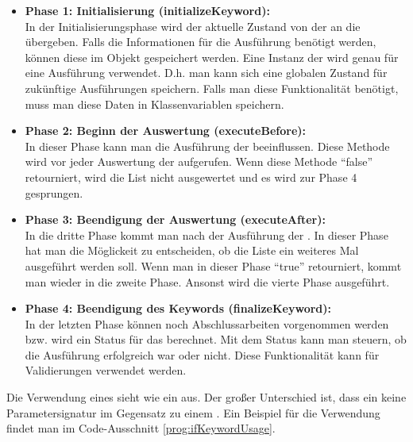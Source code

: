 \begin{itemize}

\item \textbf{Phase 1: Initialisierung (initializeKeyword):}\\
In der Initialisierungsphase wird der aktuelle Zustand von der  an die  übergeben. Falls die Informationen für die Ausführung benötigt werden, können diese im Objekt gespeichert werden. Eine Instanz der  wird genau für eine Ausführung verwendet. D.h. man kann sich eine globalen Zustand für zukünftige Ausführungen speichern. Falls man diese Funktionalität benötigt, muss man diese Daten in Klassenvariablen speichern.\\

\item \textbf{Phase 2: Beginn der Auswertung (executeBefore):}\\
In dieser Phase kann man die Ausführung der  beeinflussen. Diese Methode wird vor jeder Auswertung der  aufgerufen. Wenn diese Methode "`false"' retourniert, wird die List nicht ausgewertet und es wird zur Phase 4 gesprungen.

\item \textbf{Phase 3: Beendigung der Auswertung (executeAfter):}\\
In die dritte Phase kommt man nach der Ausführung der . In dieser Phase hat man die Möglickeit zu entscheiden, ob die Liste ein weiteres Mal ausgeführt werden soll. Wenn man in dieser Phase "`true"' retourniert, kommt man wieder in die zweite Phase. Ansonst wird die vierte Phase ausgeführt.\\

\item \textbf{Phase 4: Beendigung des Keywords (finalizeKeyword):}\\
In der letzten Phase können noch Abschlussarbeiten vorgenommen werden bzw. wird ein Status für das  berechnet. Mit dem Status kann man steuern, ob die Ausführung erfolgreich war oder nicht. Diese Funktionalität kann für Validierungen verwendet werden.

\end{itemize}

\SuperPar
Die Verwendung eines  sieht wie ein  aus. Der großer Unterschied ist, dass ein  keine Parametersignatur im Gegensatz zu einem . Ein Beispiel für die Verwendung findet man im Code-Ausschnitt \ref{prog:ifKeywordUsage}.

